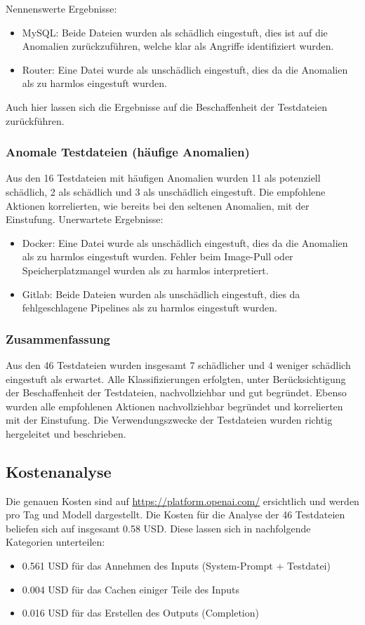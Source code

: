 \documentclass[a4paper,12pt]{report}
\begin{document}
    Nennenswerte Ergebnisse:
    \begin{itemize}
        \item MySQL: Beide Dateien wurden als schädlich eingestuft, dies ist auf die Anomalien zurückzuführen, welche klar als Angriffe identifiziert wurden.
        \item Router: Eine Datei wurde als unschädlich eingestuft, dies da die Anomalien als zu harmlos eingestuft wurden.
    \end{itemize}
    Auch hier lassen sich die Ergebnisse auf die Beschaffenheit der Testdateien zurückführen.

    \subsubsection{Anomale Testdateien (häufige Anomalien)}
    Aus den 16 Testdateien mit häufigen Anomalien wurden 11 als potenziell schädlich, 2 als schädlich und 3 als unschädlich eingestuft.
    Die empfohlene Aktionen korrelierten, wie bereits bei den seltenen Anomalien, mit der Einstufung.
    Unerwartete Ergebnisse:
    \begin{itemize}
        \item Docker: Eine Datei wurde als unschädlich eingestuft, dies da die Anomalien als zu harmlos eingestuft wurden.
        Fehler beim Image-Pull oder Speicherplatzmangel wurden als zu harmlos interpretiert.
        \item Gitlab: Beide Dateien wurden als unschädlich eingestuft, dies da fehlgeschlagene Pipelines als zu harmlos eingestuft wurden.
    \end{itemize}

    \subsubsection{Zusammenfassung}
    Aus den 46 Testdateien wurden insgesamt 7 schädlicher und 4 weniger schädlich eingestuft als erwartet.
    Alle Klassifizierungen erfolgten, unter Berücksichtigung der Beschaffenheit der Testdateien, nachvollziehbar und gut begründet.
    Ebenso wurden alle empfohlenen Aktionen nachvollziehbar begründet und korrelierten mit der Einstufung.
    Die Verwendungszwecke der Testdateien wurden richtig hergeleitet und beschrieben.

    \subsection{Kostenanalyse}\label{subsec:kostenanalyse}
    Die genauen Kosten sind auf \url{https://platform.openai.com/} ersichtlich und werden pro Tag und Modell dargestellt.
    Die Kosten für die Analyse der 46 Testdateien beliefen sich auf insgesamt 0.58 USD\@.
    Diese lassen sich in nachfolgende Kategorien unterteilen:
    \begin{itemize}
        \item 0.561 USD für das Annehmen des Inputs (System-Prompt + Testdatei)
        \item 0.004 USD für das Cachen einiger Teile des Inputs
        \item 0.016 USD für das Erstellen des Outputs (Completion)
    \end{itemize}
\end{document}
